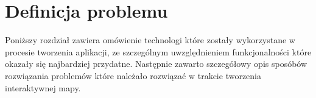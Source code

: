 \chapter{Definicja problemu}
\label{cha:problem}

Poniższy rozdział zawiera omówienie technologi które zostały wykorzystane w procesie tworzenia aplikacji, ze szczególnym uwzględnieniem funkcjonalności które okazały się najbardziej przydatne. Następnie zawarto szczegółowy opis sposóbów rozwiązania problemów które należało rozwiązać w trakcie tworzenia interaktywnej mapy.
